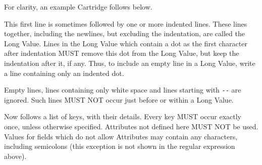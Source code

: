 \documentclass{article}
\begin{document}
For clarity, an example Cartridge follows below.

This first line is sometimes followed by one or more indented lines. These
lines together, including the newlines, but excluding the indentation, are
called the Long Value. Lines in the Long Value which contain a dot as the first
character after indentation MUST remove this dot from the Long Value, but keep
the indentation after it, if any. Thus, to include an empty line in a Long
Value, write a line containing only an indented dot.

Empty lines, lines containing only white space and lines starting with
\verb/--/ are ignored. Such lines MUST NOT occur just before or within a Long
Value.

Now follows a list of keys, with their details. Every key MUST occur exactly
once, unless otherwise specified. Attributes not defined here MUST NOT be
used. Values for fields which do not allow Attributes may contain any
characters, including semicolons (this exception is not shown in the regular
expression above).
\end{document}
